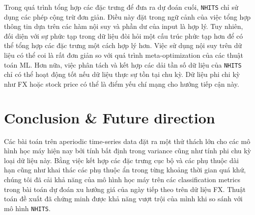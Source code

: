 \documentclass[aps,prb,groupedaddress,twocolumn,showpacs,dvipdfmx,superscriptaddress,pdftex]{revtex4-2}
\begin{document}
Trong quá trình tổng hợp các đặc trưng để đưa ra dự đoán cuối, \verb|NHITS| chỉ sử dụng các phép cộng trừ đơn giản. Điều này đặt trong ngữ cảnh của việc tổng hợp thông tin dựa trên các hàm nội suy và phần dư của input là hợp lý. Tuy nhiên, đối diện với sự phức tạp trong dữ liệu đòi hỏi một cấu trúc phức tạp hơn để có thể tổng hợp các đặc trưng một cách hợp lý hơn. Việc sử dụng nội suy trên dữ liệu có thể coi là rất đơn giản so với quá trình meta-optimization của các thuật toán ML. Hơn nữa, việc phân tách và kết hợp các dải tần số dữ liệu của \verb|NHITS| chỉ có thể hoạt động tốt nếu dữ liệu thực sự tồn tại chu kỳ. Dữ liệu phi chi kỳ như FX hoặc stock price có thể là điểm yếu chí mạng cho hướng tiếp cận này.


\section{Conclusion \& Future direction}
\label{sec.conc}

Các bài toán trên aperiodic time-series data đặt ra một thử thách lớn cho các mô hình học máy hiện nay bởi tính bất định trong variance cũng như tính phi chu kỳ loại dữ liệu này. Bằng việc kết hợp các đặc trưng cục bộ và các phụ thuộc dài hạn cũng như khai thác các phụ thuộc ẩn trong từng khoảng thời gian quá khứ, chúng tôi đã cải khả năng của mô hình học máy trên các classification metrics trong bài toán dự đoán xu hướng giá của ngày tiếp theo trên dữ liệu FX. Thuật toán đề xuất đã chứng minh được khả năng vượt trội của mình khi so sánh với mô hình \verb|NHITS|.

\end{document}
